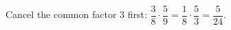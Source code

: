 Cancel the common factor $3$ first: $\dfrac38\cdot\dfrac59=\dfrac18\cdot\dfrac53=\boxed{\dfrac5{24}}$.
